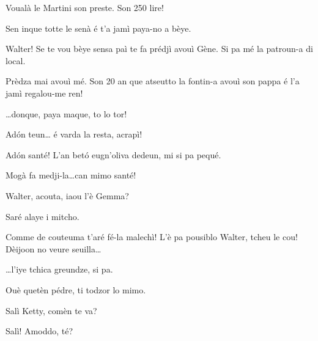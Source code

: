 \begin{drama}
\Dorinaspeaks Voualà le Martini son preste. Son 250 lire! 

\Walterspeaks	Sen inque totte le senà é t'a  jamì paya-no a bèye.

\Dorinaspeaks{} Walter! Se te vou bèye sensa paì te fa prédjì avouì Gène. Si pa mé la patroun-a di local.


\Genespeaks Prèdza mai avouì mé.  Son 20 an que atseutto la fontin-a avouì son pappa é l'a jamì regalou-me ren!


\Genespeaks{} \ldots donque, paya maque, to lo tor!

\Walterspeaks	Ad\'on teun\ldots {} é varda la resta, acrapì!

\Selmospeaks{} Ad\'on santé! L'an bet\'o eugn'oliva dedeun, mi si pa pequé.

\Walterspeaks Mogà fa medji-la\ldots can mimo santé!


\newpage
{}


\Kettyspeaks{} Walter, acouta, iaou l'è Gemma?

 
\Walterspeaks	Saré alaye i mitcho.

\Kettyspeaks Comme de couteuma t’aré fé-la  malechì! L'è pa pousiblo Walter, tcheu le cou! Dèijoon no veure seuilla\ldots


\Walterspeaks \ldots l'iye tchica greundze, si pa.

\Kettyspeaks Ouè quetèn pédre, ti todzor lo mimo.


\Selmospeaks 	{} Salì Ketty, comèn te va? 

\Kettyspeaks{} Salì! Amoddo, té?


\end{drama}
